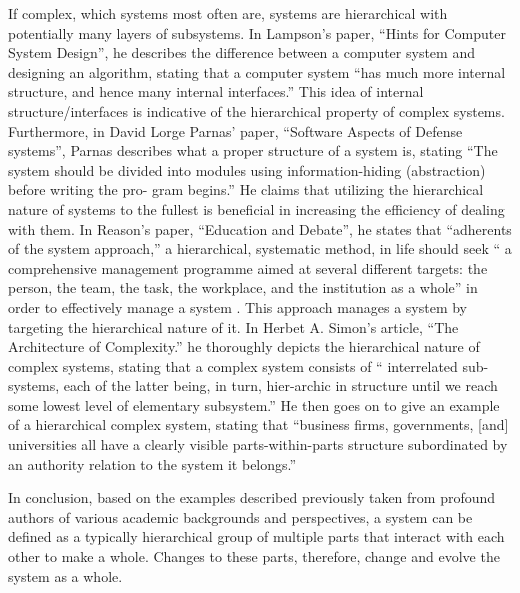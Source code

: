 \documentclass[11pt]{article}
\begin{document}
\par If complex, which systems most often are, systems are hierarchical with potentially many layers of subsystems. In Lampson’s paper, ``Hints for Computer System Design'', he describes the difference between a computer system and designing an algorithm, stating that a computer system ``has much more internal structure, and hence many internal interfaces.''\cite{lampson:1983} This idea of internal structure/interfaces is indicative of the hierarchical property of complex systems. Furthermore, in David Lorge Parnas’ paper, ``Software Aspects of Defense systems'', Parnas describes what a proper structure of a system is, stating ``The system should be divided into modules using information-hiding (abstraction) before writing the pro- gram begins.''\cite{parnas:1985} He claims that utilizing the hierarchical nature of systems to the fullest is beneficial in increasing the efficiency of dealing with them. In Reason’s paper, ``Education and Debate'', he states that ``adherents of the system approach,'' a hierarchical, systematic method, in life should seek ``  a   comprehensive management  programme  aimed  at  several  different targets: the person, the team, the task, the workplace, and the institution as a whole'' in order to effectively manage a system \cite{reason:2000}. This approach manages a system by targeting the hierarchical nature of it. In Herbet A. Simon’s article, ``The Architecture of Complexity.'' he thoroughly depicts the hierarchical nature of complex systems, stating that a complex system consists of `` interrelated sub-systems, each of the latter being, in turn, hier-archic in structure until we reach some lowest level of elementary subsystem.'' \cite{simon:1962} He then goes on to give an example of a hierarchical complex system, stating that ``business firms, governments, [and] universities all have a clearly visible parts-within-parts structure subordinated by an authority relation to the system it belongs.'' \cite{simon:1962}
\par In conclusion, based on the examples described previously taken from profound authors of various academic backgrounds and perspectives, a system can be defined as a typically hierarchical group of multiple parts that interact with each other to make a whole. Changes to these parts, therefore, change and evolve the system as a whole. 


	








\end{document}
